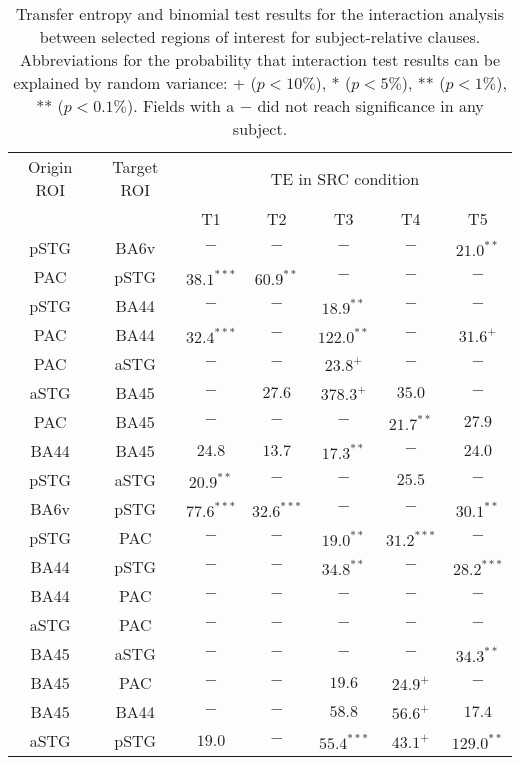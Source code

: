 \begin{table}[h]
\begin{center}
\begin{tabular}{ccccccc}
Origin ROI & Target ROI & \multicolumn{5}{c}{TE in SRC condition} \\
           &            &      T1 & T2 & T3 & T4 & T5             \\ \hline

pSTG & BA6v & $-$ & $-$ & $-$ & $-$ & $21.0^{**}$ \\ 
PAC & pSTG & $38.1^{***}$ & $60.9^{**}$ & $-$ & $-$ & $-$ \\ 
pSTG & BA44 & $-$ & $-$ & $18.9^{**}$ & $-$ & $-$ \\ 
PAC & BA44 & $32.4^{***}$ & $-$ & $122.0^{**}$ & $-$ & $31.6^{+}$ \\ 
PAC & aSTG & $-$ & $-$ & $23.8^{+}$ & $-$ & $-$ \\ 
aSTG & BA45 & $-$ & $27.6$ & $378.3^{+}$ & $35.0$ & $-$ \\ 
PAC & BA45 & $-$ & $-$ & $-$ & $21.7^{**}$ & $27.9$ \\ 
BA44 & BA45 & $24.8$ & $13.7$ & $17.3^{**}$ & $-$ & $24.0$ \\ 
pSTG & aSTG & $20.9^{**}$ & $-$ & $-$ & $25.5$ & $-$ \\ 
BA6v & pSTG & $77.6^{***}$ & $32.6^{***}$ & $-$ & $-$ & $30.1^{**}$ \\ 
pSTG & PAC & $-$ & $-$ & $19.0^{**}$ & $31.2^{***}$ & $-$ \\ 
BA44 & pSTG & $-$ & $-$ & $34.8^{**}$ & $-$ & $28.2^{***}$ \\ 
BA44 & PAC & $-$ & $-$ & $-$ & $-$ & $-$ \\ 
aSTG & PAC & $-$ & $-$ & $-$ & $-$ & $-$ \\ 
BA45 & aSTG & $-$ & $-$ & $-$ & $-$ & $34.3^{**}$ \\ 
BA45 & PAC & $-$ & $-$ & $19.6$ & $24.9^{+}$ & $-$ \\ 
BA45 & BA44 & $-$ & $-$ & $58.8$ & $56.6^{+}$ & $17.4$ \\ 
aSTG & pSTG & $19.0$ & $-$ & $55.4^{***}$ & $43.1^{+}$ & $129.0^{**}$ \\ 
\end{tabular}
\caption{\label{4.4.TEvalues.b} Transfer entropy and binomial test results for the interaction analysis between selected regions of interest for subject-relative clauses. Abbreviations for the probability that interaction test results can be explained by random variance: + ($p < 10\%$), * ($p < 5\%$), ** ($p < 1\%$), ** ($p < 0.1\%$). Fields with a $-$ did not reach significance in any subject.}
\end{center}
\end{table}
\vspace{5mm}


